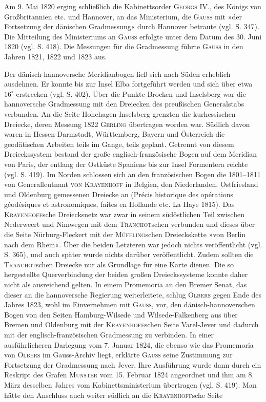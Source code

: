 \par\noindent\hspace*{\parindent}Am 9. Mai 1820 erging schließlich die Kabinettsorder \textsc{Georgs} IV., des Königs von Großbritannien etc. und Hannover, an das Ministerium, die \textsc{Gauss} mit »der Fortsetzung der dänischen Gradmessung« durch Hannover betraute (vgl. S. 347). Die Mitteilung des Ministeriums an \textsc{Gauss} erfolgte unter dem Datum des 30. Juni 1820 (vgl. S. 418). Die Messungen für die Gradmessung führte \textsc{Gauss} in den Jahren 1821, 1822 und 1823 aus.

\par\noindent\hspace*{\parindent}Der dänisch-hannoversche Meridianbogen ließ sich nach Süden erheblich ausdehnen. Er konnte bis zur Insel Elba fortgeführt werden und sich über etwa $16^\circ$ erstrecken (vgl. S. 402). Über die Punkte Brocken und Inselsberg war die hannoversche Gradmessung mit den Dreiecken des preußischen Generalstabs verbunden. An die Seite Hohehagen-Inselsberg grenzten die kurhessischen Dreiecke, deren Messung 1822 \textsc{Gerling} übertragen worden war. Südlich davon waren in Hessen-Darmstadt, Württemberg, Bayern und Österreich die geodätischen Arbeiten teils im Gange, teils geplant. Getrennt von diesem Dreieckssystem bestand der große englisch-französische Bogen auf dem Meridian von Paris, der entlang der Ostküste Spaniens bis zur Insel Formentera reichte (vgl. S. 419). Im Norden schlossen sich an den französischen Bogen die 1801--1811 von Generalleutnant \textsc{von Krayenhoff} in Belgien, den Niederlanden, Ostfriesland und Oldenburg gemessenen Dreiecke an (Précis historique des opérations géodésiques et astronomiques, faites en Hollande etc. La Haye 1815). Das \textsc{Krayenhoff}sche Dreiecksnetz war zwar in seinem südöstlichen Teil zwischen Nederweert und Nimwegen mit dem \textsc{Tranchot}schen verbunden und dieses über die Seite Nürburg-Fleckert mit der \textsc{Müffling}schen Dreieckskette »von Berlin nach dem Rhein«. Über die beiden Letzteren war jedoch nichts veröffentlicht (vgl. S. 365), und auch später wurde nichts darüber veröffentlicht. Zudem sollten die \textsc{Tranchot}schen Dreiecke nur als Grundlage für eine Karte dienen. Die so hergestellte Querverbindung der beiden großen Dreieckssysteme konnte daher nicht als ausreichend gelten. In einem Promemoria an den Bremer Senat, das dieser an die hannoversche Regierung weiterleitete, schlug \textsc{Olbers} gegen Ende des Jahres 1823, wohl im Einvernehmen mit \textsc{Gauss}, vor, den dänisch-hannoverschen Bogen von den Seiten Hamburg-Wilsede und Wilsede-Falkenberg aus über Bremen und Oldenburg mit der \textsc{Krayenhoff}schen Seite Varel-Jever und dadurch mit der englisch-französischen Gradmessung zu verbinden. In einer ausführlicheren Darlegung vom 7. Januar 1824, die ebenso wie das Promemoria von \textsc{Olbers} im Gauss-Archiv liegt, erklärte \textsc{Gauss} seine Zustimmung zur Fortsetzung der Gradmessung nach Jever. Ihre Ausführung wurde dann durch ein Reskript des Grafen \textsc{Münster} vom 15. Februar 1824 angeordnet und ihm am 8. März desselben Jahres vom Kabinettsministerium übertragen (vgl. S. 419). Man hätte den Anschluss auch weiter südlich an die \textsc{Krayenhoff}sche Seite 